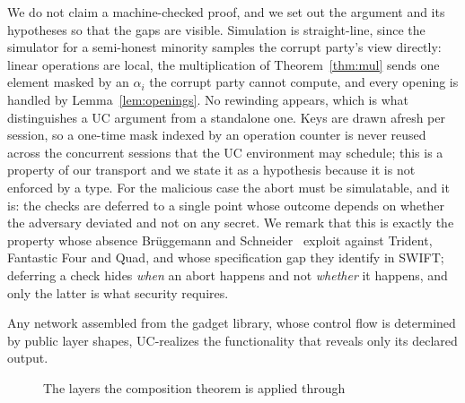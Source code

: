 \documentclass[11pt]{article}
\newcommand{\Fabb}{\mathcal{F}_{\mathsf{ABB}}}
\begin{document}
We do not claim a machine-checked proof, and we set out the argument and its hypotheses so that
the gaps are visible. Simulation is straight-line, since the simulator for a semi-honest
minority samples the corrupt party's view directly: linear operations are local, the
multiplication of Theorem~\ref{thm:mul} sends one element masked by an $\alpha_i$ the corrupt
party cannot compute, and every opening is handled by Lemma~\ref{lem:openings}. No rewinding
appears, which is what distinguishes a UC argument from a standalone one. Keys are drawn afresh
per session, so a one-time mask indexed by an operation counter is never reused across the
concurrent sessions that the UC environment may schedule; this is a property of our transport
and we state it as a hypothesis because it is not enforced by a type. For the malicious case
the abort must be simulatable, and it is: the checks are deferred to a single point whose
outcome depends on whether the adversary deviated and not on any secret. We remark that this
is exactly the property whose absence Brüggemann and Schneider~\cite{BrueggemannSchneider}
exploit against Trident, Fantastic Four and Quad, and whose specification gap they identify in
SWIFT; deferring a check hides \emph{when} an abort happens and not \emph{whether} it happens,
and only the latter is what security requires.

\begin{corolary}
\label{cor:gadgets}
Any network assembled from the gadget library, whose control flow is determined by public layer
shapes, UC-realizes the functionality that reveals only its declared output.
\end{corolary}


\begin{figure}[htb]
\centering
{}
\caption{The layers the composition theorem is applied through}
\label{fig:uclayers}
\end{figure}
\end{document}
